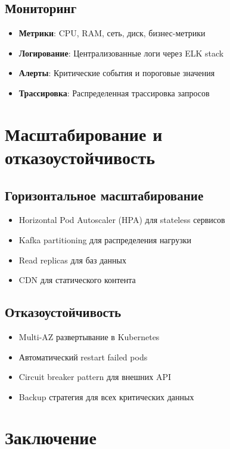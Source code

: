 \documentclass[11pt,a4paper]{article}
\begin{document}
\subsection{Мониторинг}
\begin{itemize}
    \item \textbf{Метрики}: CPU, RAM, сеть, диск, бизнес-метрики
    \item \textbf{Логирование}: Централизованные логи через ELK stack
    \item \textbf{Алерты}: Критические события и пороговые значения
    \item \textbf{Трассировка}: Распределенная трассировка запросов
\end{itemize}

\section{Масштабирование и отказоустойчивость}

\subsection{Горизонтальное масштабирование}
\begin{itemize}
    \item Horizontal Pod Autoscaler (HPA) для stateless сервисов
    \item Kafka partitioning для распределения нагрузки
    \item Read replicas для баз данных
    \item CDN для статического контента
\end{itemize}

\subsection{Отказоустойчивость}
\begin{itemize}
    \item Multi-AZ развертывание в Kubernetes
    \item Автоматический restart failed pods
    \item Circuit breaker pattern для внешних API
    \item Backup стратегия для всех критических данных
\end{itemize}

\section{Заключение}
\end{document}
